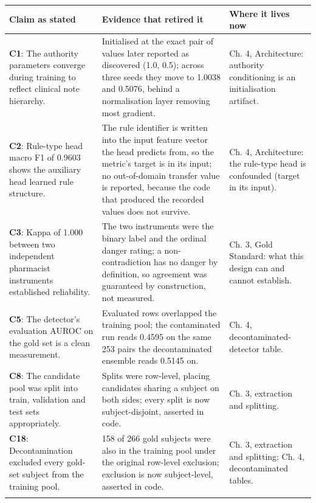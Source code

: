 \singlespacing
\renewcommand{\arraystretch}{0.9}
\footnotesize
\begin{longtable}{@{}p{1.9in}p{1.9in}p{1.9in}@{}}
\textbf{Claim as stated} & \textbf{Evidence that retired it} & \textbf{Where it lives now}\\
\midrule
\endhead
\textbf{C1}: The authority parameters converge during training to reflect clinical note hierarchy. & Initialised at the exact pair of values later reported as discovered (1.0, 0.5); across three seeds they move to 1.0038 and 0.5076, behind a normalisation layer removing most gradient. & Ch. 4, Architecture: authority conditioning is an initialisation artifact.\\
\addlinespace
\textbf{C2}: Rule-type head macro F1 of 0.9603 shows the auxiliary head learned rule structure. & The rule identifier is written into the input feature vector the head predicts from, so the metric's target is in its input; no out-of-domain transfer value is reported, because the code that produced the recorded values does not survive. & Ch. 4, Architecture: the rule-type head is confounded (target in its input).\\
\addlinespace
\textbf{C3}: Kappa of 1.000 between two independent pharmacist instruments established reliability. & The two instruments were the binary label and the ordinal danger rating; a non-contradiction has no danger by definition, so agreement was guaranteed by construction, not measured. & Ch. 3, Gold Standard: what this design can and cannot establish.\\
\addlinespace
\textbf{C5}: The detector's evaluation AUROC on the gold set is a clean measurement. & Evaluated rows overlapped the training pool; the contaminated run reads 0.4595 on the same 253 pairs the decontaminated ensemble reads 0.5145 on. & Ch. 4, decontaminated-detector table.\\
\addlinespace
\textbf{C8}: The candidate pool was split into train, validation and test sets appropriately. & Splits were row-level, placing candidates sharing a subject on both sides; every split is now subject-disjoint, asserted in code. & Ch. 3, extraction and splitting.\\
\addlinespace
\textbf{C18}: Decontamination excluded every gold-set subject from the training pool. & 158 of 266 gold subjects were also in the training pool under the original row-level exclusion; exclusion is now subject-level, asserted in code. & Ch. 3, extraction and splitting; Ch. 4, decontaminated tables.\\
\addlinespace

\end{longtable}
